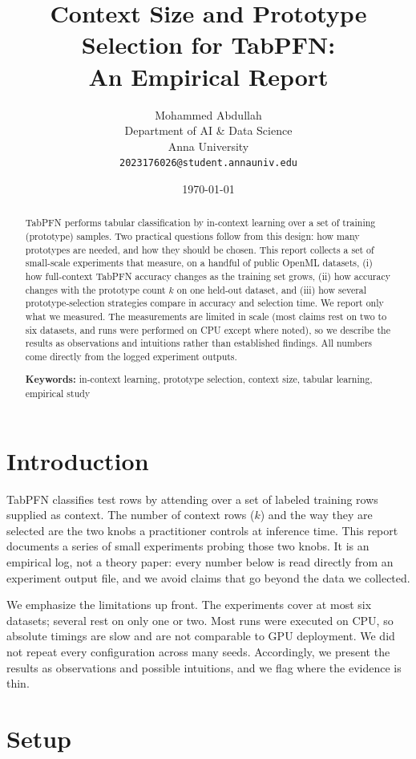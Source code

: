 \documentclass[11pt,a4paper]{article}
\title{Context Size and Prototype Selection for TabPFN:\\ An Empirical Report}
\author{
Mohammed Abdullah\\
Department of AI \& Data Science\\
Anna University\\
\texttt{2023176026@student.annauniv.edu}
}
\date{\today}
\begin{document}
\maketitle

\begin{abstract}
TabPFN performs tabular classification by in-context learning over a set of
training (prototype) samples. Two practical questions follow from this design:
how many prototypes are needed, and how they should be chosen. This report
collects a set of small-scale experiments that measure, on a handful of public
OpenML datasets, (i) how full-context TabPFN accuracy changes as the training
set grows, (ii) how accuracy changes with the prototype count $k$ on one
held-out dataset, and (iii) how several prototype-selection strategies compare
in accuracy and selection time. We report only what we measured. The
measurements are limited in scale (most claims rest on two to six datasets, and
runs were performed on CPU except where noted), so we describe the results as
observations and intuitions rather than established findings. All numbers come
directly from the logged experiment outputs.

\textbf{Keywords:} in-context learning, prototype selection, context size,
tabular learning, empirical study
\end{abstract}

\section{Introduction}

TabPFN \cite{hollmann2025tabpfn} classifies test rows by attending over a set of
labeled training rows supplied as context. The number of context rows ($k$) and
the way they are selected are the two knobs a practitioner controls at inference
time. This
report documents a series of small experiments probing those two knobs. It is
an empirical log, not a theory paper: every number below is read directly from
an experiment output file, and we avoid claims that go beyond the data we
collected.

We emphasize the limitations up front. The experiments cover at most six
datasets; several rest on only one or two. Most runs were executed on CPU, so
absolute timings are slow and are not comparable to GPU deployment. We did not
repeat every configuration across many seeds. Accordingly, we present the
results as observations and possible intuitions, and we flag where the evidence
is thin.

\section{Setup}
\end{document}
